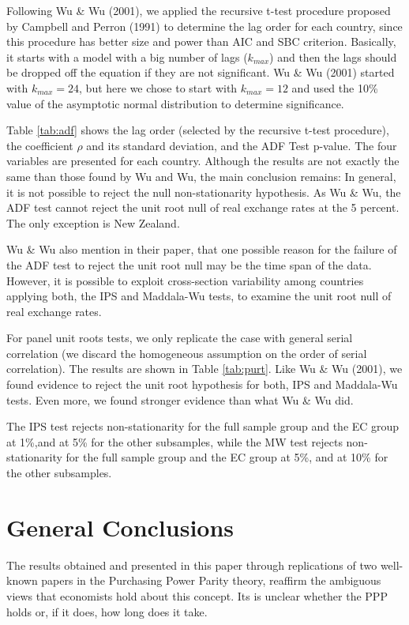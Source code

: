 \documentclass[]{article}
\begin{document}
Following Wu \& Wu (2001), we applied the recursive t-test procedure proposed by Campbell and Perron (1991) to determine the lag order for each country, since this procedure has better size and power than AIC and SBC criterion. Basically, it starts with a model with a big number of lags (\(k_{max}\)) and then the lags should be dropped off the equation if they are not significant. Wu \& Wu (2001) started with \(k_{max}=24\), but here we chose to start with \(k_{max}=12\) and used the 10\% value of the asymptotic normal distribution to determine significance.

Table \ref{tab:adf} shows the lag order (selected by the recursive t-test procedure), the coefficient \(\rho\) and its standard deviation, and the ADF Test p-value. The four variables are presented for each country. Although the results are not exactly the same than those found by Wu and Wu, the main conclusion remains: In general, it is not possible to reject the null non-stationarity hypothesis. As Wu \& Wu, the ADF test cannot reject the unit root null of real exchange rates at the 5 percent. The only exception is New Zealand.

Wu \& Wu also mention in their paper, that one possible reason for the failure of the ADF test to reject the unit root null may be the time span of the data. However, it is possible to exploit cross-section variability among countries applying both, the IPS and Maddala-Wu tests, to examine the unit root null of real exchange rates.

For panel unit roots tests, we only replicate the case with general serial correlation (we discard the homogeneous assumption on the order of serial correlation). The results are shown in Table \ref{tab:purt}. Like Wu \& Wu (2001), we found evidence to reject the unit root hypothesis for both, IPS and Maddala-Wu tests. Even more, we found stronger evidence than what Wu \& Wu did.

The IPS test rejects non-stationarity for the full sample group and the EC group at 1\%,and at 5\% for the other subsamples, while the MW test rejects non-stationarity for the full sample group and the EC group at 5\%, and at 10\% for the other subsamples.

\hypertarget{general-conclusions}{%
\section{General Conclusions}\label{general-conclusions}}

The results obtained and presented in this paper through replications of two well-known papers in the Purchasing Power Parity theory, reaffirm the ambiguous views that economists hold about this concept. Its is unclear whether the PPP holds or, if it does, how long does it take.
\end{document}
